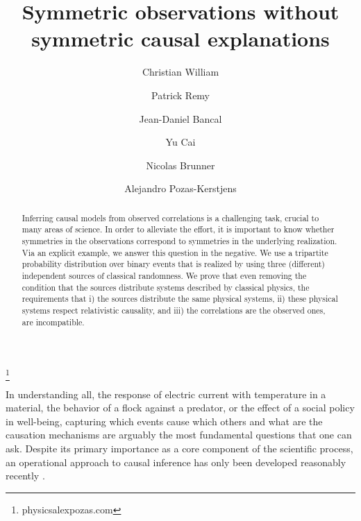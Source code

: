 \documentclass[aps,physrev,reprint,superscriptaddress,nofootinbib,twocolumn]{revtex4-2}
\begin{document}
\title{Symmetric observations without symmetric causal explanations}
\author{Christian William}
\author{Patrick Remy}
\author{Jean-Daniel Bancal}
\author{Yu Cai}
\author{Nicolas Brunner}
\author{Alejandro Pozas-Kerstjens}
\thanks{physics\faAt{}alexpozas.com}

\begin{abstract}
    Inferring causal models from observed correlations is a challenging task, crucial to many areas of science.
    In order to alleviate the effort, it is important to know whether symmetries in the observations correspond to symmetries in the underlying realization.
    Via an explicit example, we answer this question in the negative.
    We use a tripartite probability distribution over binary events that is realized by using three (different) independent sources of classical randomness.
    We prove that even removing the condition that the sources distribute systems described by classical physics, the requirements that i) the sources distribute the same physical systems, ii) these physical systems respect relativistic causality, and iii) the correlations are the observed ones, are incompatible.
\end{abstract}

\maketitle

In understanding all, the response of electric current with temperature in a material, the behavior of a flock against a predator, or the effect of a social policy in well-being, capturing which events cause which others and what are the causation mechanisms are arguably the most fundamental questions that one can ask.
Despite its primary importance as a core component of the scientific process, an operational approach to causal inference has only been developed reasonably recently \cite{causalitybook,spirtesbook}.
\end{document}
